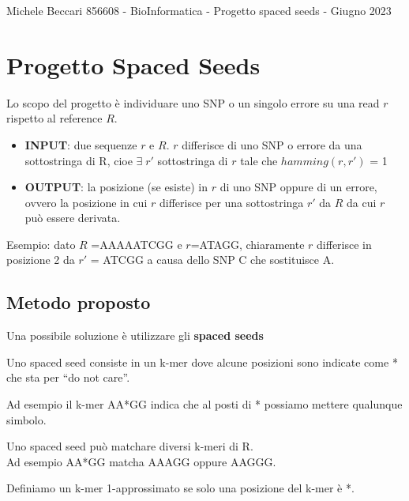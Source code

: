\documentclass{article}
\begin{document}
	{Michele Beccari 856608 - BioInformatica -  Progetto spaced seeds - Giugno 2023} 
	
	\section{Progetto Spaced Seeds}

Lo scopo del progetto è individuare uno SNP o un singolo errore su una read $r$ rispetto al reference $R$.

\begin{itemize}
	\item \textbf{INPUT}: due sequenze $r$ e $R$.
	$r$ differisce di uno SNP o errore da una sottostringa di R, cioe $\exists \; r'$ sottostringa di $r$ tale che $hamming(r, r')$ = 1
	\item \textbf{OUTPUT}: la posizione (se esiste) in $r$ di uno SNP oppure di un errore, ovvero la posizione in cui $r$ differisce per una sottostringa $r'$ da $R$ da cui $r$ può essere derivata. 
\end{itemize}

\begin{mdframed}[hidealllines=true,backgroundcolor=blue!20]
Esempio: dato $R$ =AAAAATCGG e $r$=ATAGG, chiaramente $r$ differisce in posizione 2 da $r'$ = ATCGG a causa dello SNP C che sostituisce A.
\end{mdframed} 

\subsection{Metodo proposto}
Una possibile soluzione è utilizzare gli \textbf{spaced seeds}

\begin{mdframed}[hidealllines=true,backgroundcolor=blue!20]
Uno spaced seed consiste in un k-mer dove alcune posizioni sono indicate come * che sta per “do not care”.
\end{mdframed} 

Ad esempio il k-mer AA*GG indica che al posti di * possiamo mettere qualunque simbolo.

Uno spaced seed può matchare diversi k-meri di R. \\
Ad esempio AA*GG matcha AAAGG oppure AAGGG.

\begin{mdframed}[hidealllines=true,backgroundcolor=blue!20]
Definiamo un k-mer 1-approssimato se solo una posizione del k-mer è *.
\end{mdframed}
\end{document}
